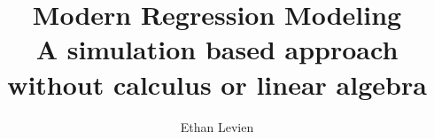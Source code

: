 
\title{%
  Modern Regression Modeling \\
  \large A simulation based approach without calculus or linear algebra}
\author{Ethan Levien}


\frontmatter




\mainmatter

 










